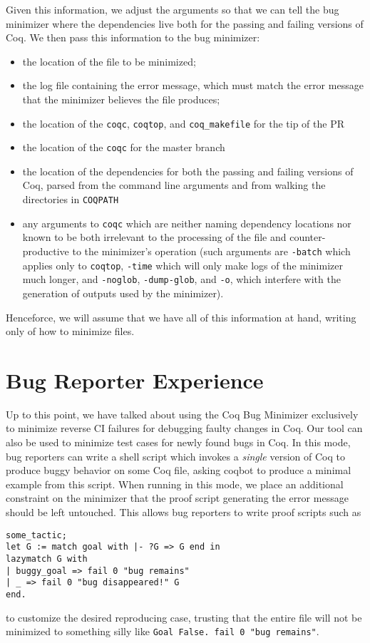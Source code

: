 \documentclass[a4paper,USenglish,cleveref,autoref,thm-restate]{lipics-v2021}
\begin{document}
Given this information, we adjust the arguments so that we can tell the bug minimizer where the dependencies live both for the passing and failing versions of Coq.
We then pass this information to the bug minimizer:
\begin{itemize}
\item the location of the file to be minimized;
\item the log file containing the error message, which must match the error message that the minimizer believes the file produces;
\item the location of the \verb|coqc|, \verb|coqtop|, and \verb|coq_makefile| for the tip of the PR
\item the location of the \verb|coqc| for the master branch
\item the location of the dependencies for both the passing and failing versions of Coq, parsed from the command line arguments and from walking the directories in \texttt{COQPATH}
\item any arguments to \verb|coqc| which are neither naming dependency locations nor known to be both irrelevant to the processing of the file and counter-productive to the minimizer's operation (such arguments are \verb|-batch| which applies only to \verb|coqtop|, \verb|-time| which will only make logs of the minimizer much longer, and \verb|-noglob|, \verb|-dump-glob|, and \verb|-o|, which interfere with the generation of outputs used by the minimizer).
\end{itemize}

Henceforce, we will assume that we have all of this information at hand, writing only of how to minimize files.


\section{Bug Reporter Experience}
Up to this point, we have talked about using the Coq Bug Minimizer exclusively to minimize reverse CI failures for debugging faulty changes in Coq.
Our tool can also be used to minimize test cases for newly found bugs in Coq.
In this mode, bug reporters can write a shell script which invokes a \emph{single} version of Coq to produce buggy behavior on some Coq file, asking coqbot to produce a minimal example from this script.
When running in this mode, we place an additional constraint on the minimizer that the proof script generating the error message should be left untouched.
This allows bug reporters to write proof scripts such as
\begin{verbatim}
some_tactic;
let G := match goal with |- ?G => G end in
lazymatch G with
| buggy_goal => fail 0 "bug remains"
| _ => fail 0 "bug disappeared!" G
end.
\end{verbatim}
to customize the desired reproducing case, trusting that the entire file will not be minimized to something silly like \verb|Goal False. fail 0 "bug remains"|.
\end{document}
